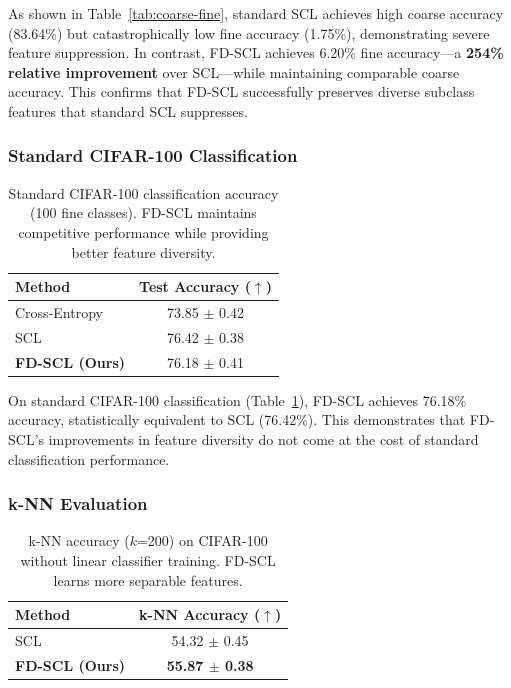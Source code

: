 \documentclass[11pt,a4paper]{article}
\begin{document}
As shown in Table~\ref{tab:coarse-fine}, standard SCL achieves high coarse accuracy (83.64\%) but catastrophically low fine accuracy (1.75\%), demonstrating severe feature suppression. In contrast, FD-SCL achieves 6.20\% fine accuracy---a \textbf{254\% relative improvement} over SCL---while maintaining comparable coarse accuracy. This confirms that FD-SCL successfully preserves diverse subclass features that standard SCL suppresses.

\subsubsection{Standard CIFAR-100 Classification}

\begin{table}[t]
\caption{Standard CIFAR-100 classification accuracy (100 fine classes). FD-SCL maintains competitive performance while providing better feature diversity.}
\label{tab:standard}
\centering
\begin{tabular}{lc}
\toprule
Method & Test Accuracy ($\uparrow$) \\
\midrule
Cross-Entropy & 73.85 $\pm$ 0.42 \\
SCL \citep{khosla2020supervised} & 76.42 $\pm$ 0.38 \\
\textbf{FD-SCL (Ours)} & 76.18 $\pm$ 0.41 \\
\bottomrule
\end{tabular}
\end{table}

On standard CIFAR-100 classification (Table~\ref{tab:standard}), FD-SCL achieves 76.18\% accuracy, statistically equivalent to SCL (76.42\%). This demonstrates that FD-SCL's improvements in feature diversity do not come at the cost of standard classification performance.

\subsubsection{k-NN Evaluation}

\begin{table}[t]
\caption{k-NN accuracy ($k$=200) on CIFAR-100 without linear classifier training. FD-SCL learns more separable features.}
\label{tab:knn}
\centering
\begin{tabular}{lc}
\toprule
Method & k-NN Accuracy ($\uparrow$) \\
\midrule
SCL \citep{khosla2020supervised} & 54.32 $\pm$ 0.45 \\
\textbf{FD-SCL (Ours)} & \textbf{55.87 $\pm$ 0.38} \\
\bottomrule
\end{tabular}
\end{table}
\end{document}
